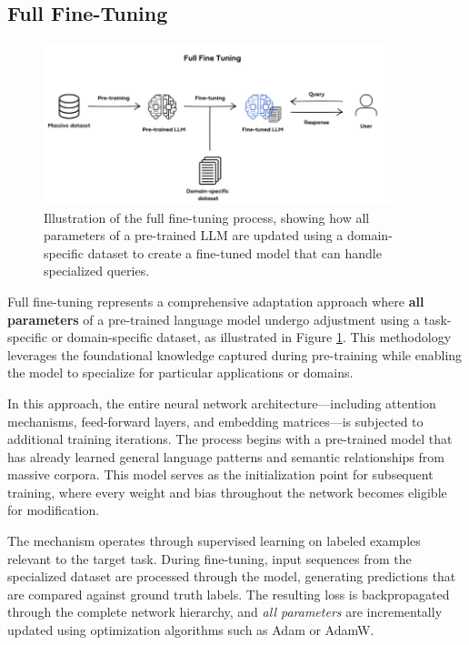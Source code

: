 \subsection{Full Fine-Tuning}
\begin{figure}[ht]
\centering
\includegraphics[width=0.9\textwidth]{img/chap05/5.2.1.png}
\caption{Illustration of the full fine-tuning process, showing how all parameters of a pre-trained LLM are updated using a domain-specific dataset to create a fine-tuned model that can handle specialized queries.}
\label{fig:full-fine-tuning}
\end{figure}

Full fine-tuning represents a comprehensive adaptation approach where \textbf{all parameters} of a pre-trained language model undergo adjustment using a task-specific or domain-specific dataset, as illustrated in Figure \ref{fig:full-fine-tuning}. This methodology leverages the foundational knowledge captured during pre-training while enabling the model to specialize for particular applications or domains.

\vspace{0.5cm}

In this approach, the entire neural network architecture—including attention mechanisms, feed-forward layers, and embedding matrices—is subjected to additional training iterations. The process begins with a pre-trained model that has already learned general language patterns and semantic relationships from massive corpora. This model serves as the initialization point for subsequent training, where every weight and bias throughout the network becomes eligible for modification.

\vspace{0.5cm}

The mechanism operates through supervised learning on labeled examples relevant to the target task. During fine-tuning, input sequences from the specialized dataset are processed through the model, generating predictions that are compared against ground truth labels. The resulting loss is backpropagated through the complete network hierarchy, and \textit{all parameters} are incrementally updated using optimization algorithms such as Adam or AdamW.

